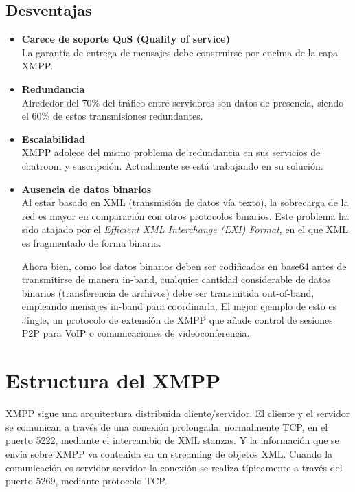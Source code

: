 \documentclass[a4paper, 11pt]{article} %
\begin{document}
   \subsection{Desventajas}
   \begin{itemize}
    \item \textbf{Carece de soporte QoS (Quality of service)}\\
    La garantía de entrega de mensajes debe construirse por encima de la capa XMPP.
    
    \item \textbf{Redundancia}\\
    Alrededor del 70\% del tráfico entre servidores son datos de presencia, siendo el 
    60\% de estos transmisiones redundantes.
    
    \item \textbf{Escalabilidad}\\
    XMPP adolece del mismo problema de redundancia en sus servicios de chatroom y 
    suscripción. Actualmente se está trabajando en su solución.
    
    \item \textbf{Ausencia de datos binarios}\\
    Al estar basado en XML (transmisión de datos vía texto), la sobrecarga de la red es
    mayor en comparación con otros protocolos binarios. Este problema ha sido atajado por 
    el \textit{Efficient XML Interchange (EXI) Format}, en el que XML es fragmentado de forma binaria.
    
    Ahora bien, como los datos binarios deben ser codificados en base64 antes de transmitirse de manera in-band,
    cualquier cantidad considerable de datos binarios (transferencia de archivos) debe ser transmitida out-of-band,
    empleando mensajes in-band para coordinarla. El mejor ejemplo de esto es Jingle, un protocolo de extensión de XMPP
    que añade control de sesiones P2P para VoIP o comunicaciones de videoconferencia.
    
   \end{itemize}


\section{Estructura del XMPP}
  XMPP sigue una arquitectura distribuida cliente/servidor. El cliente y el servidor se comunican a través 
  de una conexión prolongada, normalmente TCP, en el puerto 5222, mediante el intercambio de XML stanzas. Y la información 
  que se envía sobre XMPP va contenida en un streaming de objetos XML. Cuando la comunicación es servidor-servidor la 
  conexión se realiza típicamente a través del puerto 5269, mediante protocolo TCP.  
  
\end{document}
